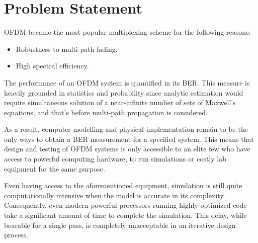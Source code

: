 \section{Problem Statement}
\gls{OFDM} became the most popular multiplexing scheme for the following reasons:
\begin{itemize}
	\item Robustness to multi-path fading.
	\item High spectral efficiency.
\end{itemize}
The performance of an \gls{OFDM} system is quantified in its \gls{BER}. This measure is heavily grounded in statistics and probability since analytic estimation would require simultaneous solution of a near-infinite number of sets of Maxwell's equations, and that's before multi-path propagation is considered\cite{wireless_design}.

As a result, computer modelling and physical implementation remain to be the only ways to obtain a \gls{BER} measurement for a specified system. This means that design and testing of \gls{OFDM} systems is only accessible to an elite few who have access to powerful computing hardware, to run simulations or costly lab equipment for the same purpose.

Even having access to the aforementioned equipment, simulation is still quite computationally intensive when the model is accurate in its complexity\cite{wireless_design}. Consequently, even modern powerful processors running highly optimized code take a significant amount of time to complete the simulation. This delay, while bearable for a single pass, is completely unacceptable in an iterative design process.

